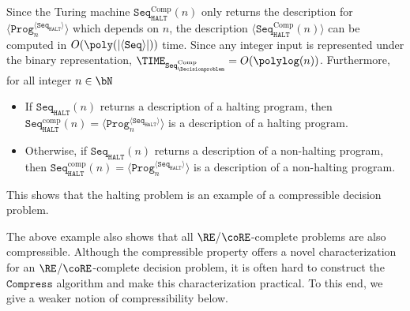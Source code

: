 \begin{example}
	Since the Turing machine $\texttt{Seq}_{\texttt{HALT}}^{\text{Comp}}(n)$ only returns the description for $\langle \texttt{Prog}_{n}^{\langle\texttt{Seq}_{\texttt{HALT}} \rangle } \rangle$ which depends on $n$, the description $\langle \texttt{Seq}_{\texttt{HALT}}^{\text{Comp}}(n) \rangle$ can be computed in $O(\poly(|\langle \texttt{Seq} \rangle|))$ time. Since any integer input is represented under the binary representation, $\TIME_{\texttt{Seq}^{\text{Comp}}_{\Decisionproblem}} = O(\polylog(n))$. Furthermore, for all integer $n \in \bN$ 
	\begin{itemize}
		\item If $\texttt{Seq}_{\texttt{HALT}}(n)$ returns a description of a halting program, then $\texttt{Seq}_{\texttt{HALT}}^{\text{comp}}(n) = \langle \texttt{Prog}_{n}^{\langle\texttt{Seq}_{\texttt{HALT}} \rangle } \rangle$ is a description of a halting program. 
		\item Otherwise, if $\texttt{Seq}_{\texttt{HALT}}(n)$ returns a description of a non-halting program, then $\texttt{Seq}_{\texttt{HALT}}^{\text{comp}}(n) = \langle \texttt{Prog}_{n}^{\langle\texttt{Seq}_{\texttt{HALT}} \rangle } \rangle$ is a description of a non-halting program.
	\end{itemize}
	This shows that the halting problem is an example of a compressible decision problem. 
\end{example}

The above example also shows that all $\RE$/$\coRE$-complete problems are also compressible. Although the compressible property offers a novel characterization for an $\RE$/$\coRE$-complete decision problem, it is often hard to construct the $\texttt{Compress}$ algorithm and make this characterization practical. To this end, we give a weaker notion of compressibility below. 

